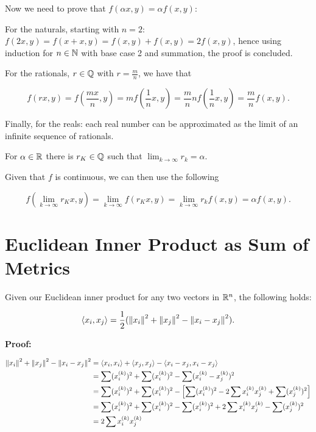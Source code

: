 Now we need to prove that \(f(\alpha x, y) = \alpha f(x, y)\):

For the naturals, starting with \(n = 2\): \(f(2x, y) = f(x + x, y) = f(x, y) + f(x, y) = 2f(x, y)\), hence 
using induction for \(n \in \mathbb{N}\) with base case 2 and summation, the proof is concluded.

For the rationals, \(r \in \mathbb{Q}\) with \(r = \frac{m}{n}\), we have that 

\[
    f(rx, y) = f\left(\frac{mx}{n}, y\right) = m f\left(\frac{1}{n}x, y\right) =
    \frac{m}{n}n f\left(\frac{1}{n}x, y\right) = \frac{m}{n} f\left(x, y\right).
\]

Finally, for the reals: each real number can be approximated as the limit of an infinite sequence of rationals.

For \(\alpha \in \mathbb{R}\) there is \(r_K \in \mathbb{Q}\) such that \(\lim_{k \to \infty} r_k = \alpha\). 

Given that \(f\) is continuous, we can then use the following 

\[
    f\left(\lim_{k \to \infty} r_K x, y\right) = \lim_{k \to \infty}f(r_K x, y) = \lim_{k \to \infty}r_k f(x, y) = \alpha f(x, y).
\]

\QED

\section{Euclidean Inner Product as Sum of Metrics}

Given our Euclidean inner product for any two vectors in \(\mathbb{R}^n\), the following holds:

\[
    \left\langle x_i, x_j\right\rangle = \frac{1}{2} (\left\| x_i \right\|^2 + \left\| x_j \right\|^2 - \left\| x_i - x_j \right\|^2).
\]

\textbf{Proof:}

\begin{align*} 
    \left\| x_i \right\|^2 + \left\| x_j \right\|^2 - \left\| x_i - x_j \right\|^2 &= \left\langle x_i, x_i\right\rangle+ \left\langle x_j, x_j\right\rangle - \left\langle x_i - x_j, x_i - x_j\right\rangle \\ 
    &= \sum (x_i^{(k)})^2 + \sum (x_i^{(k)})^2  - \sum (x_i^{(k)} - x_j^{(k)})^2 \\
    &= \sum (x_i^{(k)})^2 + \sum (x_i^{(k)})^2  - \left[\sum (x_i^{(k)})^2 - 2 \sum x_i^{(k)} x_j^{(k)} + \sum (x_j^{(k)})^2\right] \\ 
    &= \sum (x_i^{(k)})^2 + \sum (x_i^{(k)})^2  -\sum (x_i^{(k)})^2 + 2 \sum x_i^{(k)} x_j^{(k)} - \sum (x_j^{(k)})^2 \\ 
    &= 2 \sum x_i^{(k)} x_j^{(k)}
\end{align*}

